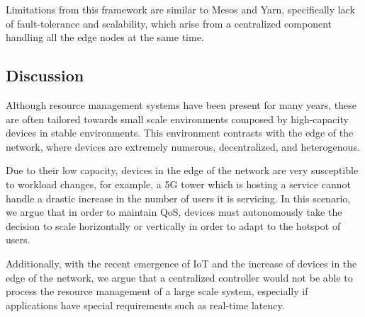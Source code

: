 Limitations from this framework are similar to Mesos and Yarn, specifically lack of fault-tolerance and scalability, which arise from a centralized component handling all the edge nodes at the same time. 

\subsection{Discussion}

Although resource management systems have been present for many years, these are often tailored towards small scale environments composed by high-capacity devices in stable environments. This environment contrasts with the edge of the network, where devices are extremely numerous, decentralized, and heterogenous.

Due to their low capacity, devices in the edge of the network are very susceptible to workload changes, for example, a 5G tower which is hosting a service cannot handle a drastic increase in the number of users it is servicing. In this scenario, we argue that in order to maintain QoS, devices must autonomously take the decision to scale horizontally or vertically in order to adapt to the hotspot of users.

Additionally, with the recent emergence of IoT and the increase of devices in the edge of the network, we argue that a centralized controller would not be able to process the resource management of a large scale system, especially if applications have special requirements such as real-time latency.





